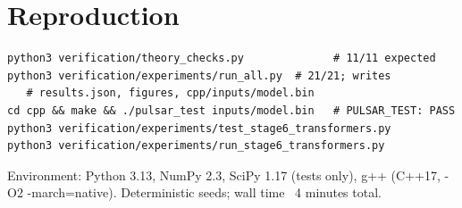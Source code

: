 \documentclass[11pt,a4paper]{article}
\theoremstyle{definition}
\begin{document}
\section{Reproduction}
\begin{lstlisting}[style=code]
python3 verification/theory_checks.py              # 11/11 expected
python3 verification/experiments/run_all.py  # 21/21; writes
   # results.json, figures, cpp/inputs/model.bin
cd cpp && make && ./pulsar_test inputs/model.bin   # PULSAR_TEST: PASS
python3 verification/experiments/test_stage6_transformers.py
python3 verification/experiments/run_stage6_transformers.py
\end{lstlisting}
Environment: Python 3.13, NumPy 2.3, SciPy 1.17 (tests only), g++ (C++17,
-O2 -march=native). Deterministic seeds; wall time ~4 minutes total.
\end{document}
